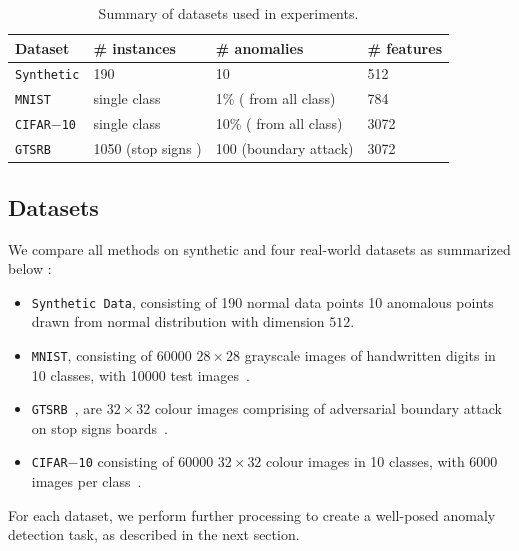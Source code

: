 \begin{table}[!t]
    \centering
    \renewcommand{\arraystretch}{1.25}
    \setlength{\tabcolsep}{6pt}
    \begin{tabular}{@{}llll@{}}
        \toprule
        \toprule
        Dataset & \# instances & \# anomalies & \# features \\
        \toprule
        {\tt Synthetic}       & 190   & 10                                        & 512 \\
        {\tt MNIST}           & single class   & 1\%  ( from all class)            & 784 \\
        {\tt CIFAR$-$10}      & single class    & 10\% ( from all class)           &3072 \\
        {\tt GTSRB }           & 1050 (stop signs )     & 100 (boundary attack)  &3072 \\
        \bottomrule
    \end{tabular}
    \caption{Summary of datasets used in experiments.}
    \label{tbl:datasets}
    \vspace{-\baselineskip}
\end{table}

\subsection{Datasets}
We compare all methods on synthetic and four real-world datasets as summarized below :
\begin{itemize}
    \item {\tt Synthetic Data}, consisting of 190 normal data points 10 anomalous points drawn from normal distribution with dimension $512$.
    \item {\tt MNIST}, consisting of 60000 $28\times28$ grayscale images of handwritten digits  in 10 classes, with 10000  test images~\cite{lecun2010mnist}.
    \item {\tt GTSRB }, are $32\times32$ colour images comprising of  adversarial boundary attack on stop signs boards~\cite{stallkamp2011german}.
    \item {\tt CIFAR$-$10} consisting of 60000 $32\times32$ colour images in 10 classes, with 6000 images per class~\cite{krizhevsky2009learning}.
\end{itemize}

For each dataset, we perform further processing to create a well-posed anomaly detection task, as described in the next section.
\vspace{-0.3 cm}

